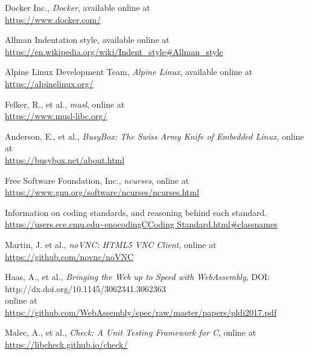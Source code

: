 \documentclass[letterpaper]{article}
\begin{document}
\begin{thebibliography}{9}

    Docker Inc., \emph{Docker}, available online at\\
    \url{https://www.docker.com/}

    Allman Indentation style, available online at\\
    \url{https://en.wikipedia.org/wiki/Indent_style#Allman_style}

    Alpine Linux Development Team, \emph{Alpine Linux},
    available online at\\
    \url{https://alpinelinux.org/}

    Felker, R., et al., \emph{musl},
    online at\\
    \url{https://www.musl-libc.org/}

    Anderson, E., et al.,
    \emph{BusyBox: The Swiss Army Knife of Embedded Linux},
    online at\\
    \url{https://busybox.net/about.html}

    Free Software Foundation, Inc., \emph{ncurses},
    online at\\
    \url{https://www.gnu.org/software/ncurses/ncurses.html}

    Information on coding standards, and reasoning behind each
    standard.\\
    \url{https://users.ece.cmu.edu~enocodingCCoding
    Standard.html#classnames}

    Martin, J. et al., \emph{noVNC: HTML5 VNC Client},
    online at\\
    \url{https://github.com/novnc/noVNC}

    Haas, A., et al.,
    \emph{Bringing the Web up to Speed with WebAssembly},
    DOI: http://dx.doi.org/10.1145/3062341.3062363\\
    online at\\
    \url{https://github.com/WebAssembly/spec/raw/master/papers/pldi2017.pdf}
    
    Malec, A., et al., \emph{Check: A Unit Testing Framework for C},
    online at\\
    \url{https://libcheck.github.io/check/}

\end{thebibliography}

\end{document}
